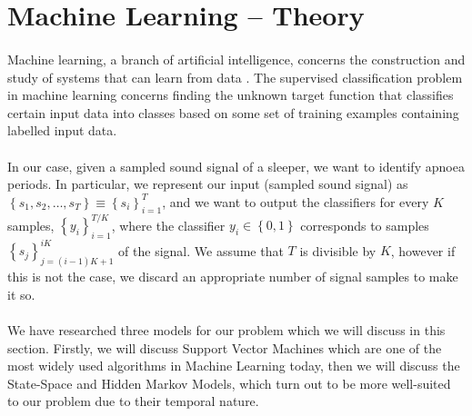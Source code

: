 \section{Machine Learning -- Theory}

\paragraph{}
	Machine learning, a branch of artificial intelligence, concerns the construction and study of systems that can learn from data \cite{wiki:machineLearning}. The supervised classification problem in machine learning concerns finding the unknown target function that classifies certain input data into classes based on some set of training examples containing labelled input data.
	
\paragraph{}
	In our case, given a sampled sound signal of a sleeper, we want to identify apnoea periods. In particular, we represent our input (sampled sound signal) as $\left\{s_1, s_2, \dotsc, s_T \right\} \equiv \left\{ s_i \right\}_{i = 1}^{T}$, and we want to output the classifiers for every $K$ samples, $\left\{ y_i \right\}_{i = 1}^{T/K}$, where the classifier $y_i \in \left\{0, 1\right\}$ corresponds to samples $\left\{ s_j \right\}_{j = \left(i - 1\right)K + 1}^{iK}$ of the signal. We assume that $T$ is divisible by $K$, however if this is not the case, we discard an appropriate number of signal samples to make it so.
	
\paragraph{}
	We have researched three models for our problem which we will discuss in this section. Firstly, we will discuss Support Vector Machines which are one of the most widely used algorithms in Machine Learning today, then we will discuss the State-Space and Hidden Markov Models, which turn out to be more well-suited to our problem due to their temporal nature.
	



